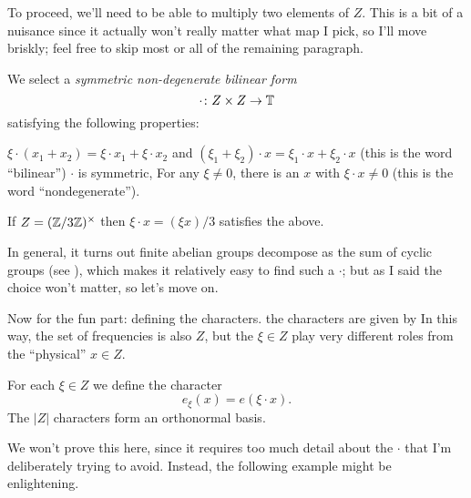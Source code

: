 To proceed, we'll need to be able to multiply two elements of $Z$.
This is a bit of a nuisance since it actually won't really
matter what map I pick, so I'll move briskly;
feel free to skip most or all of the remaining paragraph.
\begin{definition}
We select a \emph{symmetric non-degenerate bilinear form}
\[ \cdot \colon Z \times Z \to \mathbb T \]
satisfying the following properties:
\begin{itemize}
	\ii $\xi \cdot (x_1 + x_2) = \xi \cdot x_1 + \xi \cdot x_2$
	and $(\xi_1 + \xi_2) \cdot x = \xi_1 \cdot x + \xi_2 \cdot x$
	(this is the word ``bilinear'')
	\ii $\cdot$ is symmetric,
	\ii For any $\xi \neq 0$, there is an $x$ with $\xi \cdot x \neq 0$
	(this is the word ``nondegenerate'').
\end{itemize}
\end{definition}
\begin{example}
	If $Z = (\mathbb Z/3\mathbb Z)^\times$ then $\xi \cdot x = (\xi x)/3$ satisfies the above.
\end{example}
In general, it turns out finite abelian groups
decompose as the sum of cyclic groups (see ),
which makes it relatively easy to find such a $\cdot$;
but as I said the choice won't matter, so let's move on.

Now for the fun part: defining the characters.
the characters are given by
In this way, the set of frequencies is also $Z$,
but the $\xi \in Z$ play very different roles from the ``physical'' $x \in Z$.
\begin{proposition}
	For each $\xi \in Z$ we define the character
	\[ e_\xi(x) = e(\xi \cdot x). \]
	The $|Z|$ characters form an orthonormal basis.
\end{proposition}
We won't prove this here, since it requires too
much detail about the $\cdot$ that
I'm deliberately trying to avoid.
Instead, the following example might be enlightening.

